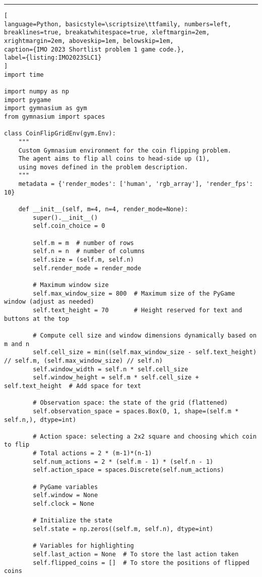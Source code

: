 \hrule
\begin{lstlisting}[
language=Python, basicstyle=\scriptsize\ttfamily, numbers=left, breaklines=true, breakatwhitespace=true, xleftmargin=2em, xrightmargin=2em, aboveskip=1em, belowskip=1em,
caption={IMO 2023 Shortlist problem 1 game code.},
label={listing:IMO2023SLC1}
]
import time

import numpy as np
import pygame
import gymnasium as gym
from gymnasium import spaces

class CoinFlipGridEnv(gym.Env):
    """
    Custom Gymnasium environment for the coin flipping problem.
    The agent aims to flip all coins to head-side up (1),
    using moves defined in the problem description.
    """
    metadata = {'render_modes': ['human', 'rgb_array'], 'render_fps': 10}

    def __init__(self, m=4, n=4, render_mode=None):
        super().__init__()
        self.coin_choice = 0

        self.m = m  # number of rows
        self.n = n  # number of columns
        self.size = (self.m, self.n)
        self.render_mode = render_mode

        # Maximum window size
        self.max_window_size = 800  # Maximum size of the PyGame window (adjust as needed)
        self.text_height = 70       # Height reserved for text and buttons at the top

        # Compute cell size and window dimensions dynamically based on m and n
        self.cell_size = min((self.max_window_size - self.text_height) // self.m, (self.max_window_size) // self.n)
        self.window_width = self.n * self.cell_size
        self.window_height = self.m * self.cell_size + self.text_height  # Add space for text

        # Observation space: the state of the grid (flattened)
        self.observation_space = spaces.Box(0, 1, shape=(self.m * self.n,), dtype=int)

        # Action space: selecting a 2x2 square and choosing which coin to flip
        # Total actions = 2 * (m-1)*(n-1)
        self.num_actions = 2 * (self.m - 1) * (self.n - 1)
        self.action_space = spaces.Discrete(self.num_actions)

        # PyGame variables
        self.window = None
        self.clock = None

        # Initialize the state
        self.state = np.zeros((self.m, self.n), dtype=int)

        # Variables for highlighting
        self.last_action = None  # To store the last action taken
        self.flipped_coins = []  # To store the positions of flipped coins


\end{lstlisting}
